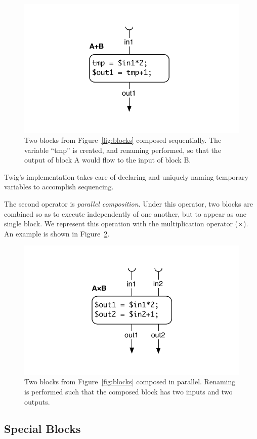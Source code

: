 \begin{figure}[ht]
\centering
\includegraphics[width=0.75\columnwidth]{images/code-gen2}
\caption{Two blocks from Figure~\ref{fig:blocks} composed sequentially.
The variable ``tmp'' is created, and renaming performed, so that the output of
block A would flow to the input of block B.}
\label{fig:codegen-seq}
\end{figure}

Twig's implementation takes care of declaring and uniquely naming
temporary variables to accomplish sequencing.

The second operator is \emph{parallel composition}. Under this operator, two
blocks are combined so as to execute independently of one another, but to appear
as one single block. We represent this operation with the multiplication
operator ($\times$). An example is shown in Figure~\ref{fig:codegen-par}.

\begin{figure}[ht]
\centering
\includegraphics[width=0.75\columnwidth]{images/code-gen3}
\caption{Two blocks from Figure~\ref{fig:blocks} composed in parallel.
Renaming is performed such that the composed block has two inputs and two 
outputs.}
\label{fig:codegen-par}
\end{figure}

\subsection{Special Blocks}

